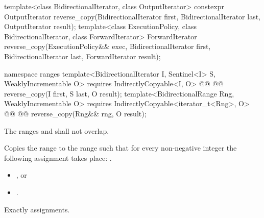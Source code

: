 %
\begin{itemdecl}
template<class BidirectionalIterator, class OutputIterator>
  constexpr OutputIterator
    reverse_copy(BidirectionalIterator first, BidirectionalIterator last,
                 OutputIterator result);
template<class ExecutionPolicy, class BidirectionalIterator, class ForwardIterator>
  ForwardIterator
    reverse_copy(ExecutionPolicy&& exec,
                 BidirectionalIterator first, BidirectionalIterator last,
                 ForwardIterator result);
\end{itemdecl}
\begin{addedblock}
\begin{itemdecl}
namespace ranges {
  template<BidirectionalIterator I, Sentinel<I> S, WeaklyIncrementable O>
    requires IndirectlyCopyable<I, O>
    @@
    @@
      reverse_copy(I first, S last, O result);
  template<BidirectionalRange Rng, WeaklyIncrementable O>
    requires IndirectlyCopyable<iterator_t<Rng>, O>
    @@
    @@
      reverse_copy(Rng&& rng, O result);
}
\end{itemdecl}
\end{addedblock}

\begin{itemdescr}
\pnum
\requires
The ranges
and
shall not overlap.

\pnum
\effects
Copies the range
to the range
such that
for every non-negative integer
the following assignment takes place:
.

\pnum
\returns
\begin{itemize}
\item {}, or

\item {}.
\end{itemize}

\pnum
\complexity
Exactly
assignments.
\end{itemdescr}


